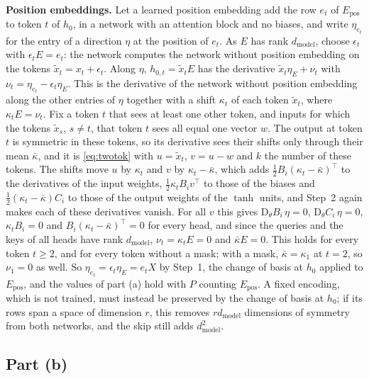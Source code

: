 \documentclass[10pt]{article}
\theoremstyle{definition}
\theoremstyle{remark}
\newcommand{\dm}{d_{\mathrm{model}}}
\newcommand{\Der}{\mathrm{D}}
\newcommand{\para}[1]{\smallskip\noindent\textbf{#1}\hspace{0.5em}}
\begin{document}
\para{Position embeddings.} Let a learned position embedding add the row $e_t$ of $E_{\mathrm{pos}}$ to token $t$ of $h_0$, in a network with an attention block and no biases, and write $\eta_{e_t}$ for the entry of a direction $\eta$ at the position of $e_t$. As $E$ has rank $\dm$, choose $\epsilon_t$ with $\epsilon_tE = e_t$: the network computes the network without position embedding on the tokens $\tilde x_t = x_t + \epsilon_t$. Along $\eta$, $h_{0,t} = \tilde x_tE$ has the derivative $\tilde x_t\eta_E + \nu_t$ with $\nu_t = \eta_{e_t} - \epsilon_t\eta_E$. This is the derivative of the network without position embedding along the other entries of $\eta$ together with a shift $\kappa_t$ of each token $\tilde x_t$, where $\kappa_tE = \nu_t$. Fix a token $t$ that sees at least one other token, and inputs for which the tokens $\tilde x_s$, $s \neq t$, that token $t$ sees all equal one vector $w$. The output at token $t$ is symmetric in these tokens, so its derivative sees their shifts only through their mean $\bar\kappa$, and it is \cref{eq:twotok} with $u = \tilde x_t$, $v = u - w$ and $k$ the number of these tokens. The shifts move $u$ by $\kappa_t$ and $v$ by $\kappa_t - \bar\kappa$, which adds $\tfrac12B_i(\kappa_t - \bar\kappa)^\top$ to the derivatives of the input weights, $\tfrac12\kappa_tB_iv^\top$ to those of the biases and $\tfrac12(\kappa_t - \bar\kappa)C_i$ to those of the output weights of the $\tanh$ units, and Step~2 again makes each of these derivatives vanish. For all $v$ this gives $\Der_\theta B_i\,\eta = 0$, $\Der_\theta C_i\,\eta = 0$, $\kappa_tB_i = 0$ and $B_i(\kappa_t - \bar\kappa)^\top = 0$ for every head, and since the queries and the keys of all heads have rank $\dm$, $\nu_t = \kappa_tE = 0$ and $\bar\kappa E = 0$. This holds for every token $t \ge 2$, and for every token without a mask; with a mask, $\bar\kappa = \kappa_1$ at $t = 2$, so $\nu_1 = 0$ as well. So $\eta_{e_t} = \epsilon_t\eta_E = e_tX$ by Step~1, the change of basis at $h_0$ applied to $E_{\mathrm{pos}}$, and the values of part (a) hold with $P$ counting $E_{\mathrm{pos}}$. A fixed encoding, which is not trained, must instead be preserved by the change of basis at $h_0$; if its rows span a space of dimension $r$, this removes $r\dm$ dimensions of symmetry from both networks, and the skip still adds $\dm^2$.

\subsection*{Part (b)}
\end{document}

